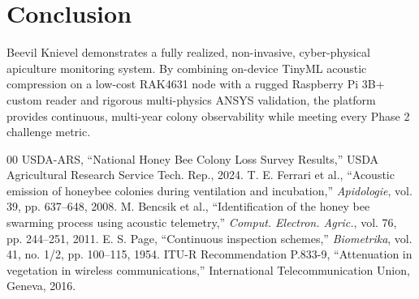 \documentclass[10pt,conference,letterpaper]{IEEEtran}
\begin{document}
\section{Conclusion}
Beevil Knievel demonstrates a fully realized, non-invasive, cyber-physical apiculture monitoring system. By combining on-device TinyML acoustic compression on a low-cost RAK4631 node with a rugged Raspberry Pi 3B+ custom reader and rigorous multi-physics ANSYS validation, the platform provides continuous, multi-year colony observability while meeting every Phase 2 challenge metric.

\begin{thebibliography}{00}
 USDA-ARS, ``National Honey Bee Colony Loss Survey Results,'' USDA Agricultural Research Service Tech. Rep., 2024.
 T. E. Ferrari et al., ``Acoustic emission of honeybee colonies during ventilation and incubation,'' \textit{Apidologie}, vol. 39, pp. 637--648, 2008.
 M. Bencsik et al., ``Identification of the honey bee swarming process using acoustic telemetry,'' \textit{Comput. Electron. Agric.}, vol. 76, pp. 244--251, 2011.
 E. S. Page, ``Continuous inspection schemes,'' \textit{Biometrika}, vol. 41, no. 1/2, pp. 100--115, 1954.
 ITU-R Recommendation P.833-9, ``Attenuation in vegetation in wireless communications,'' International Telecommunication Union, Geneva, 2016.
\end{thebibliography}
\end{document}
